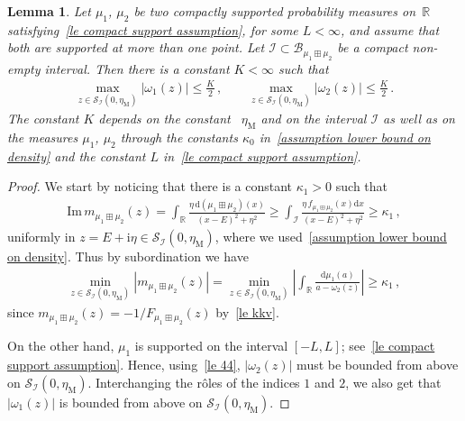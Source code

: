 \documentclass[10pt,reqno]{amsart}
\numberwithin{equation}{section}
\theoremstyle{plain}
\newtheorem{lemma}[theorem]{Lemma}
\numberwithin{kevin}{section}
\theoremstyle{remark}
\newcommand{\im}{\mathrm{Im}\,}
\newcommand{\R}{{\mathbb R }}
\newcommand{\ii}{\mathrm{i}}
\newcommand{\dd}{\mathrm{d}}
\begin{document}
\begin{lemma}\label{le lem upper bound on omega}
Let $\mu_1$, $\mu_2$ be two compactly supported probability measures on~$\R$ satisfying~\eqref{le compact support assumption}, for some $L<\infty$, and assume that both are supported at more than one point. Let $\mathcal{I}\subset \mathcal{B}_{\mu_1\boxplus\mu_2}$ be a compact non-empty interval.
Then there is a constant $K<\infty$ such that
\begin{align}\label{le lem upper bound on omega equation}
 \max_{z\in\mathcal{S}_{\mathcal{I}}(0,\eta_{\mathrm{M}})} |\omega_1(z)|\le\frac{K}{2} \,,\qquad  \max_{z\in\mathcal{S}_{\mathcal{I}}(0,\eta_{\mathrm{M}})} |\omega_2(z)|\le \frac{K}{2}\,.
\end{align}
The constant $K$ depends on the constant ~$\eta_{\mathrm{M}}$ and on the interval $\mathcal{I}$ as well as  on the measures $\mu_1$, $\mu_2$ through the constants $\kappa_0$ in~\eqref{assumption lower bound on density} and the constant $L$ in~\eqref{le compact support assumption}.
\end{lemma}
\begin{proof}
 We start by noticing that there is a constant $\kappa_1>0$ such that
 \begin{align}\label{le mimimi}
 \im m_{\mu_1\boxplus\mu_2}(z)=\int_\R\frac{\eta\,\dd( \mu_1\boxplus\mu_2)(x)}{(x-E)^2+\eta^2}\ge\int_\mathcal{I}\frac{\eta\, f_{\mu_1\boxplus\mu_2}(x)\dd x}{(x-E)^2+\eta^2}\ge \kappa_1\,,
\end{align}
uniformly in $z=E+\ii\eta\in\mathcal{S}_{\mathcal{I}}(0,\eta_{\mathrm{M}}) $, where we used~\eqref{assumption lower bound on density}. Thus by subordination we have
 \begin{align}\label{le 44}
  \min_{z\in\mathcal{S}_{\mathcal{I}}(0,\eta_{\mathrm{M}})}|m_{\mu_1\boxplus\mu_2}(z)|=\min_{z\in\mathcal{S}_{\mathcal{I}}(0,\eta_{\mathrm{M}})}\left|\int_\R\frac{\dd\mu_1(a)}{a-\omega_2(z)} \right|\ge \kappa_1\,,
 \end{align}
 since $m_{\mu_1\boxplus\mu_2}(z)=-1/F_{\mu_1\boxplus\mu_2}(z)$ by~\eqref{le kkv}.
 
On the other hand, $\mu_1$ is supported on the interval $[-L,L]$; see~\eqref{le compact support assumption}. Hence, using~\eqref{le 44}, $|\omega_2(z)|$ must be bounded from above on $\mathcal{S}_{\mathcal{I}}(0,\eta_{\mathrm{M}})$.  Interchanging the r\^{o}les of the indices $1$ and $2$, we also get that $|\omega_1(z)|$ is bounded from above on $\mathcal{S}_{\mathcal{I}}(0,\eta_{\mathrm{M}})$. \qedhere
\end{proof}
\end{document}
